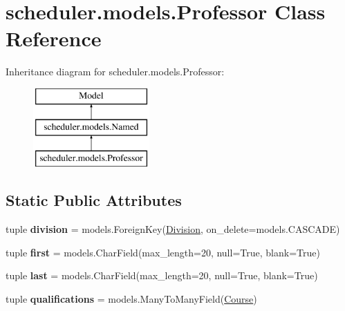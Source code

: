 \hypertarget{classscheduler_1_1models_1_1_professor}{\section{scheduler.\-models.\-Professor Class Reference}
\label{classscheduler_1_1models_1_1_professor}
}
Inheritance diagram for scheduler.\-models.\-Professor\-:\begin{figure}[H]
\begin{center}
\leavevmode
\includegraphics[height=3.000000cm]{classscheduler_1_1models_1_1_professor}
\end{center}
\end{figure}
\subsection*{Static Public Attributes}
\begin{DoxyCompactItemize}
\item 
\hypertarget{classscheduler_1_1models_1_1_professor_adf91e6bff4702170c31cb6135f23f31b}{tuple {\bfseries division} = models.\-Foreign\-Key(\hyperlink{classscheduler_1_1models_1_1_division}{Division}, on\-\_\-delete=models.\-C\-A\-S\-C\-A\-D\-E)}\label{classscheduler_1_1models_1_1_professor_adf91e6bff4702170c31cb6135f23f31b}

\item 
\hypertarget{classscheduler_1_1models_1_1_professor_a5a76821dd158b7ee380cac02a95ef14f}{tuple {\bfseries first} = models.\-Char\-Field(max\-\_\-length=20, null=True, blank=True)}\label{classscheduler_1_1models_1_1_professor_a5a76821dd158b7ee380cac02a95ef14f}

\item 
\hypertarget{classscheduler_1_1models_1_1_professor_a399cc5731fa62ed365a91c4c1dfe45d0}{tuple {\bfseries last} = models.\-Char\-Field(max\-\_\-length=20, null=True, blank=True)}\label{classscheduler_1_1models_1_1_professor_a399cc5731fa62ed365a91c4c1dfe45d0}

\item 
\hypertarget{classscheduler_1_1models_1_1_professor_a49cca96860ed2452e86fc3877ad9d767}{tuple {\bfseries qualifications} = models.\-Many\-To\-Many\-Field(\hyperlink{classscheduler_1_1models_1_1_course}{Course})}\label{classscheduler_1_1models_1_1_professor_a49cca96860ed2452e86fc3877ad9d767}

\end{DoxyCompactItemize}

